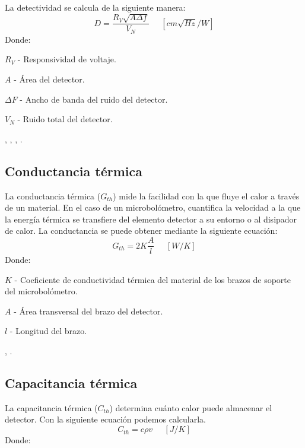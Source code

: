         La detectividad se calcula de la siguiente manera:
        \begin{equation}
        D = \frac{R_{V} \sqrt{A\Delta f}}{V_{N}}\phantom{abc} [cm\sqrt{Hz}/W]
        \label{eq:Detectivity}
        \end{equation}
        Donde:
        
        
        $R_{V}$ - Responsividad de voltaje.
        
        
        $A$ - Área del detector.
        
        
        $\Delta F$ - Ancho de banda del ruido del detector.
        
        
        $V_{N}$ - Ruido total del detector.
        
        \cite{Vincent}, \cite{Jimenez}, \cite{Budzier}, \cite{Bhan2009}.
                
        \subsection{Conductancia térmica}
        La conductancia térmica ($G_{th}$) mide la facilidad con la que fluye el calor a través de un material. En el caso de un microbolómetro, cuantifica la velocidad a la que la energía térmica se transfiere del elemento detector a su entorno o al disipador de calor. La conductancia se puede obtener mediante la siguiente ecuación:
        \begin{equation}
        G_{th} = 2K\frac{A}{l}\phantom{abc} [W/K]
        \label{eq:Conductancia}
        \end{equation}   
        Donde:
        
        
        $K$ - Coeficiente de conductividad térmica del material de los brazos de soporte del microbolómetro.
        
        
        $A$ - Área transversal del brazo del detector.
        
        
        $l$ - Longitud del brazo.
        
        \cite{BlancoMDA}, \cite{Jimenez} \cite{Bhan2009}.        
        \subsection{Capacitancia térmica}
        La capacitancia térmica ($C_{th}$) determina cuánto calor puede almacenar el detector. Con la siguiente ecuación podemos calcularla.
        \begin{equation}
        C_{th} = c\rho v\phantom{abc} [J/K]
        \label{eq:Capacitancia}
        \end{equation} 
        Donde:
        
